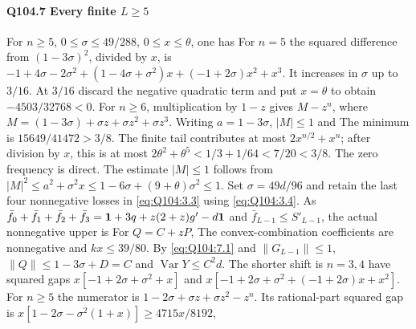\paragraph{Q104.7 Every finite $L\ge\allowbreak 5$}\label{part:Q104.7}
For $n\ge\allowbreak 5$, $0\le\allowbreak \sigma\le\allowbreak 49/288$, $0\le\allowbreak  x\le\allowbreak \theta$, one has
For $n=\allowbreak 5$ the squared difference from $(1-3\sigma)^2$, divided by $x$, is
$-1+4\sigma-2\sigma^2+(1-4\sigma+\sigma^2)x+(-1+2\sigma)x^2+x^3$.
It increases in $\sigma$ up to $3/16$.
At $3/16$ discard the negative quadratic term and put $x=\allowbreak \theta$ to
obtain $-4503/32768<\allowbreak 0$.
For $n\ge\allowbreak 6$, multiplication by $1-z$ gives $M-z^n$, where
$M=\allowbreak (1-3\sigma)+\sigma z+\sigma z^2+\sigma z^3$.
Writing $a=\allowbreak 1-3\sigma$, $|M|\le\allowbreak 1$ and
The minimum is $15649/41472>\allowbreak 3/8$.
The finite tail contributes at most $2x^{n/2}+x^n$;
after division by $x$, this is at most
$2\theta^2+\theta^5<\allowbreak 1/3+1/64<\allowbreak 7/20<\allowbreak 3/8$.
The zero frequency is direct.
The estimate $|M|\le\allowbreak 1$ follows from
$|M|^2\le\allowbreak  a^2+\sigma^2x\le\allowbreak 1-6\sigma+(9+\theta)\sigma^2\le\allowbreak 1$.
Set $\sigma=\allowbreak 49d/96$ and retain the last four nonnegative losses in
\eqref{eq:Q104:3.3} using \eqref{eq:Q104:3.4}.
As $\bar f_0+\bar f_1+\bar f_2+\bar f_3
=\mathbf1+3q+z(2+z)g'-d\mathbf1$ and $\bar f_{L-1}\le S'_{L-1}$,
the actual nonnegative upper is
For $Q=\allowbreak C+zP$,
The convex-combination coefficients are nonnegative and $kx\le\allowbreak 39/80$.
By \eqref{eq:Q104:7.1} and $\|G_{L-1}\|\le\allowbreak 1$,
$\|Q\|\le\allowbreak 1-3\sigma+D=\allowbreak C$ and $\operatorname{Var}Y\le\allowbreak  C^2d$.
The shorter shift is
$n=\allowbreak 3,\allowbreak 4$ have squared gaps
$x[-1+2\sigma+\sigma^2+x]$ and
$x[-1+2\sigma+\sigma^2+(-1+2\sigma)x+x^2]$.
For $n\ge\allowbreak 5$ the numerator is
$1-2\sigma+\sigma z+\sigma z^2-z^n$.
Its rational-part squared gap is
$x[1-2\sigma-\sigma^2(1+x)]\ge\allowbreak 4715x/8192$,
